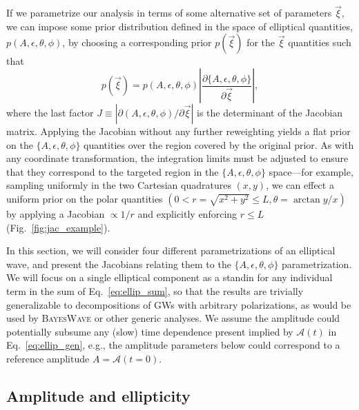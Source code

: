 \documentclass[aps,prd,twocolumn,superscriptaddress,preprintnumbers,floatfix,nofootinbib]{revtex4-2}
\begin{document}
If we parametrize our analysis in terms of some alternative set of parameters $\vec{\xi}$, we can impose some prior distribution defined in the space of elliptical quantities, $p({A, \epsilon, \theta, \phi})$, by choosing a corresponding prior $p(\vec{\xi})$ for the $\vec{\xi}$ quantities such that
\begin{equation} \label{eq:jac}
p \left( \vec{\xi} \right) = p \left( A, \epsilon, \theta, \phi \right) \left| \frac{\partial \{A, \epsilon, \theta, \phi\}}{\partial \vec{\xi}} \right| ,
\end{equation}
where the last factor $J \equiv | \partial (A, \epsilon, \theta, \phi)/\partial \vec{\xi} |$ is the determinant of the Jacobian matrix.
Applying the Jacobian without any further reweighting yields a flat prior on the  $\{A, \epsilon, \theta, \phi\}$ quantities over the region covered by the original prior.
As with any coordinate transformation, the integration limits must be adjusted to ensure that they correspond to the targeted region in the $\{A, \epsilon, \theta, \phi\}$ space---for example, sampling uniformly in the two Cartesian quadratures $(x, y)$, we can effect a uniform prior on the polar quantities $(0 < r=\sqrt{x^2+y^2} \leq L, \theta= \arctan y/x)$ by applying a Jacobian $\propto 1/r$ and explicitly enforcing $r \leq L$ (Fig.~\ref{fig:jac_example}).

In this section, we will consider four different parametrizations of an elliptical wave, and present the Jacobians relating them to the $\{A, \epsilon, \theta, \phi\}$ parametrization.
We will focus on a single elliptical component as a standin for any individual term in the sum of Eq.~\eqref{eq:ellip_sum}, so that the results are trivially generalizable to decompositions of GWs with arbitrary polarizations, as would be used by \textsc{BayesWave} or other generic analyses.
We assume the amplitude could potentially subsume any (slow) time dependence present implied by $\mathcal{A}(t)$ in Eq.~\eqref{eq:ellip_gen}, e.g., the amplitude parameters below could correspond to a reference amplitude $A=\mathcal{A}(t=0)$.

\subsection{Amplitude and ellipticity}
\label{sec:jac:Achi}
\end{document}
